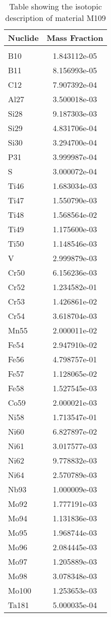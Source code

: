 \begin{centering}
\begin{table}[ht!]
\begin{tabular}{l | c}
\hline
Nuclide & Mass Fraction\\
\hline
\\
B10 & 1.843112e-05\\
B11 & 8.156993e-05\\
C12 & 7.907392e-04\\
Al27 & 3.500018e-03\\
Si28 & 9.187303e-03\\
Si29 & 4.831706e-04\\
Si30 & 3.294700e-04\\
P31 & 3.999987e-04\\
S & 3.000072e-04\\
Ti46 & 1.683034e-03\\
Ti47 & 1.550790e-03\\
Ti48 & 1.568564e-02\\
Ti49 & 1.175600e-03\\
Ti50 & 1.148546e-03\\
V & 2.999879e-03\\
Cr50 & 6.156236e-03\\
Cr52 & 1.234582e-01\\
Cr53 & 1.426861e-02\\
Cr54 & 3.618704e-03\\
Mn55 & 2.000011e-02\\
Fe54 & 2.947910e-02\\
Fe56 & 4.798757e-01\\
Fe57 & 1.128065e-02\\
Fe58 & 1.527545e-03\\
Co59 & 2.000021e-03\\
Ni58 & 1.713547e-01\\
Ni60 & 6.827897e-02\\
Ni61 & 3.017577e-03\\
Ni62 & 9.778832e-03\\
Ni64 & 2.570789e-03\\
Nb93 & 1.000009e-03\\
Mo92 & 1.777191e-03\\
Mo94 & 1.131836e-03\\
Mo95 & 1.968744e-03\\
Mo96 & 2.084445e-03\\
Mo97 & 1.205889e-03\\
Mo98 & 3.078348e-03\\
Mo100 & 1.253653e-03\\
Ta181 & 5.000035e-04
\end{tabular}
\caption{Table showing the isotopic description of material M109}
\label{table:material_M109}
\end{table}\clearpage


\end{centering}
